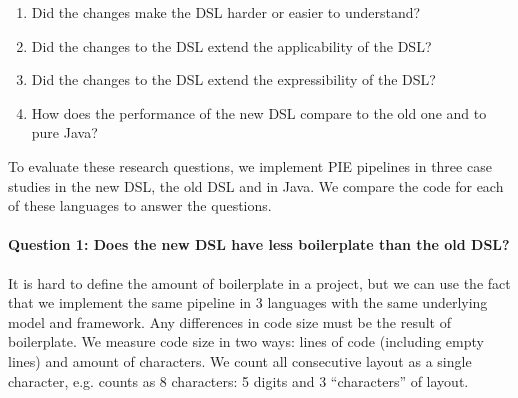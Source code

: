 \begin{enumerate}
  \item Did the changes make the \ac{DSL} harder or easier to understand?
  \item Did the changes to the \ac{DSL} extend the applicability of the \ac{DSL}?
  \item Did the changes to the \ac{DSL} extend the expressibility of the \ac{DSL}?
  \item How does the performance of the new \ac{DSL} compare to the old one and to pure Java?
\end{enumerate}


To evaluate these research questions, we implement \ac{PIE} pipelines in three case studies in the new \ac{DSL}, the old \ac{DSL} and in Java.
We compare the code for each of these languages to answer the questions.

\paragraph{Question 1: Does the new \ac{DSL} have less boilerplate than the old \ac{DSL}?}
It is hard to define the amount of boilerplate in a project, but we can use the fact that we implement the same pipeline in 3 languages with the same underlying model and framework.
Any differences in code size must be the result of boilerplate.
We measure code size in two ways: lines of code (including empty lines) and amount of characters.
We count all consecutive layout as a single character, e.g.  counts as 8 characters: 5 digits and 3 ``characters'' of layout. 

